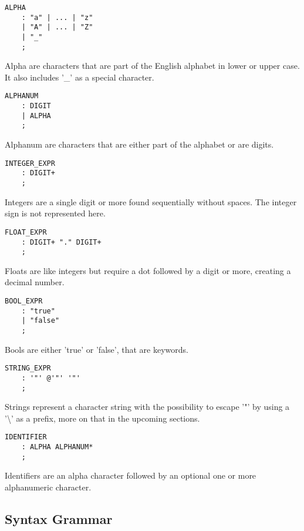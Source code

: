 \begin{lstlisting}
ALPHA
    : "a" | ... | "z"
    | "A" | ... | "Z"
    | "_"
    ;
\end{lstlisting}

Alpha are characters that are part of the English alphabet in lower or upper case. It also includes '\_' as a special character.

\begin{lstlisting}
ALPHANUM
    : DIGIT
    | ALPHA
    ;
\end{lstlisting}

Alphanum are characters that are either part of the alphabet or are digits.

\begin{lstlisting}
INTEGER_EXPR
    : DIGIT+
    ;
\end{lstlisting}

Integers are a single digit or more found sequentially without spaces. The integer sign is not represented here.

\begin{lstlisting}
FLOAT_EXPR
    : DIGIT+ "." DIGIT+
    ;
\end{lstlisting}

Floats are like integers but require a dot followed by a digit or more, creating a decimal number.

\clearpage

\begin{lstlisting}
BOOL_EXPR
    : "true"
    | "false"
    ;
\end{lstlisting}

Bools are either 'true' or 'false', that are keywords.

\begin{lstlisting}
STRING_EXPR
    : '"' @'"' '"'
    ;
\end{lstlisting}

Strings represent a character string with the possibility to escape '"' by using a '\textbackslash' as a prefix, more on that in the upcoming sections.

\begin{lstlisting}
IDENTIFIER
    : ALPHA ALPHANUM*
    ;
\end{lstlisting}

Identifiers are an alpha character followed by an optional one or more alphanumeric character.

\subsection{Syntax Grammar}

